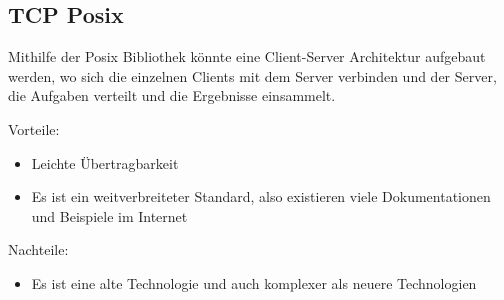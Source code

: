 \subsection{TCP Posix}
Mithilfe der Posix Bibliothek könnte eine
Client-Server Architektur aufgebaut werden, wo sich die einzelnen Clients mit dem Server
verbinden und der Server, die Aufgaben verteilt und die Ergebnisse einsammelt.

Vorteile:
\begin{itemize}
    \item Leichte Übertragbarkeit
    \item Es ist ein weitverbreiteter Standard, also existieren viele Dokumentationen und
    Beispiele im Internet
\end{itemize}

Nachteile:
\begin{itemize}
    \item Es ist eine alte Technologie und auch komplexer als neuere Technologien
\end{itemize}